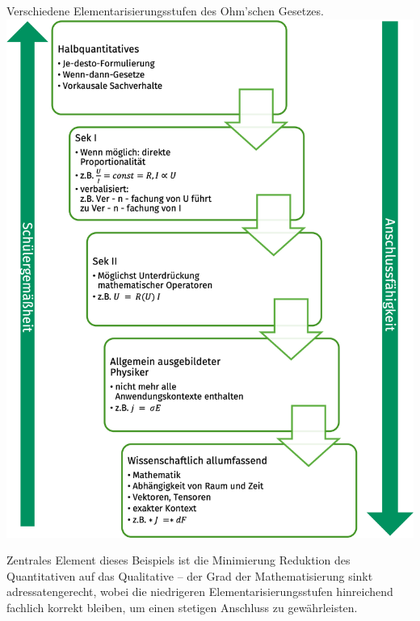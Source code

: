 \begin{samepage}
\begin{beisp2}
	Verschiedene Elementarisierungsstufen des Ohm'schen Gesetzes.
	\includegraphics[width=\textwidth]{Bilder/ohm}
	
	Zentrales Element dieses Beispiels ist die Minimierung Reduktion des Quantitativen auf das Qualitative -- der Grad der Mathematisierung sinkt adressatengerecht, wobei die niedrigeren Elementarisierungsstufen hinreichend fachlich korrekt bleiben, um einen stetigen Anschluss zu gewährleisten. 
\end{beisp2}
\end{samepage}

